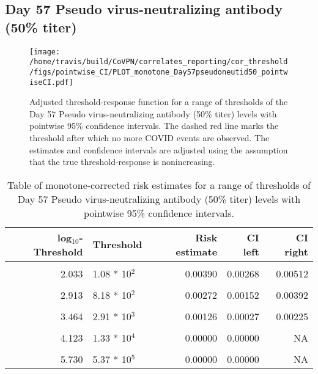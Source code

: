 \documentclass[]{book}
\theoremstyle{definition}
\theoremstyle{definition}
\theoremstyle{definition}
\newcommand{\1}{\mathbbm{1}}
\begin{document}
\clearpage

\clearpage

\clearpage

\hypertarget{day-57-pseudo-virus-neutralizing-antibody-50-titer-1}{%
\subsection{Day 57 Pseudo virus-neutralizing antibody (50\% titer)}\label{day-57-pseudo-virus-neutralizing-antibody-50-titer-1}}

\begin{figure}[H]
\centering
\texttt{[image: /home/travis/build/CoVPN/correlates\_reporting/cor\_threshold/figs/pointwise\_CI/PLOT\_monotone\_Day57pseudoneutid50\_pointwiseCI.pdf]}
\caption{Adjusted threshold-response function for a range of thresholds of the
  Day 57 Pseudo virus-neutralizing antibody (50\% titer) levels with pointwise 95\% confidence intervals. The dashed red line marks the threshold after which no more COVID events are observed. The estimates and confidence intervals are adjusted using the assumption that the true threshold-response is nonincreasing.}
\end{figure}
\begin{table}[!h]

\caption{\label{tab:unnamed-chunk-367}Table of monotone-corrected risk estimates for a range of thresholds of Day 57 Pseudo virus-neutralizing antibody (50\% titer) levels with pointwise 95\% confidence intervals.}
\centering
\begin{tabular}[t]{rlrrr}
\toprule
log$_{10}$-Threshold & Threshold & Risk estimate & CI left & CI right\\
\midrule
\cellcolor{gray!6}{0.699} & \cellcolor{gray!6}{5.00 * 10$^0$} & \cellcolor{gray!6}{0.00508} & \cellcolor{gray!6}{0.00376} & \cellcolor{gray!6}{0.00639}\\
2.033 & 1.08 * 10$^2$ & 0.00390 & 0.00268 & 0.00512\\
\cellcolor{gray!6}{2.447} & \cellcolor{gray!6}{2.80 * 10$^2$} & \cellcolor{gray!6}{0.00347} & \cellcolor{gray!6}{0.00223} & \cellcolor{gray!6}{0.00471}\\
2.913 & 8.18 * 10$^2$ & 0.00272 & 0.00152 & 0.00392\\
\cellcolor{gray!6}{3.196} & \cellcolor{gray!6}{1.57 * 10$^3$} & \cellcolor{gray!6}{0.00235} & \cellcolor{gray!6}{0.00112} & \cellcolor{gray!6}{0.00358}\\
3.464 & 2.91 * 10$^3$ & 0.00126 & 0.00027 & 0.00225\\
\cellcolor{gray!6}{3.736} & \cellcolor{gray!6}{5.45 * 10$^3$} & \cellcolor{gray!6}{0.00126} & \cellcolor{gray!6}{0.00005} & \cellcolor{gray!6}{0.00247}\\
4.123 & 1.33 * 10$^4$ & 0.00000 & 0.00000 & NA\\
\cellcolor{gray!6}{4.629} & \cellcolor{gray!6}{4.26 * 10$^4$} & \cellcolor{gray!6}{0.00000} & \cellcolor{gray!6}{0.00000} & \cellcolor{gray!6}{NA}\\
5.730 & 5.37 * 10$^5$ & 0.00000 & 0.00000 & NA\\
\bottomrule
\end{tabular}
\end{table}
\end{document}
